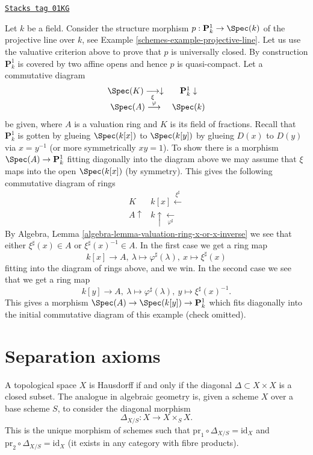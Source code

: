 \begin{example}
\label{schemes-example-projective-line-universally-closed}
\href{https://stacks.math.columbia.edu/tag/01KG}{\texttt{Stacks tag 01KG}}

Let $k$ be a field. Consider the structure morphism
$p : \mathbf{P}^1_k \to \Spec(k)$ of the projective
line over $k$, see Example \ref{schemes-example-projective-line}.
Let us use the valuative criterion above to prove that $p$
is universally closed.
By construction $\mathbf{P}^1_k$ is covered by two
affine opens and hence $p$ is quasi-compact.
Let a commutative diagram
$$
\begin{array}{cc}\Spec(K) \underset{\xi}{\longrightarrow}\downarrow & \mathbf{P}^1_k \downarrow \\ \Spec(A) \overset{\varphi}{\longrightarrow} & \Spec(k)\end{array}
$$
be given, where $A$ is a valuation ring and $K$ is its field
of fractions. Recall that $\mathbf{P}^1_k$ is gotten by glueing
$\Spec(k[x])$ to $\Spec(k[y])$ by glueing
$D(x)$ to $D(y)$ via $x = y^{-1}$ (or more symmetrically $xy = 1$).
To show there is a morphism $\Spec(A) \to \mathbf{P}^1_k$
fitting diagonally into the diagram above we may assume that $\xi$
maps into the open $\Spec(k[x])$ (by symmetry). This gives the following
commutative diagram of rings
$$
\begin{array}{cc}K & k[x] \overset{\xi^\sharp}{\longleftarrow} \\ A \uparrow & k \uparrow\underset{\varphi^\sharp}{\longleftarrow}\end{array}
$$
By Algebra, Lemma \ref{algebra-lemma-valuation-ring-x-or-x-inverse}
we see that either
$\xi^\sharp(x) \in A$ or $\xi^\sharp(x)^{-1} \in A$.
In the first case we get a ring map
$$
k[x] \to A,
\ \lambda \mapsto \varphi^\sharp(\lambda),
\  x \mapsto \xi^\sharp(x)
$$
fitting into the diagram of rings above, and we win.
In the second case we see that we get a ring map
$$
k[y] \to A,
\ \lambda \mapsto \varphi^\sharp(\lambda),
\ y \mapsto \xi^\sharp(x)^{-1}.
$$
This gives a morphism
$\Spec(A) \to \Spec(k[y]) \to \mathbf{P}^1_k$
which fits diagonally into the initial commutative diagram of this example
(check omitted).
\end{example}

\section{Separation axioms}
\label{schemes-section-separation-axioms}
A topological space $X$ is Hausdorff if and only if the
diagonal $\Delta \subset X \times X$ is a closed subset.
The analogue in algebraic geometry is, given a scheme $X$ over
a base scheme $S$, to consider the
diagonal morphism
$$
\Delta_{X/S} : X \longrightarrow X \times_S X.
$$
This is the unique morphism of schemes such that
$\text{pr}_1 \circ \Delta_{X/S} = \text{id}_X$ and
$\text{pr}_2 \circ \Delta_{X/S} = \text{id}_X$ (it exists in
any category with fibre products).

